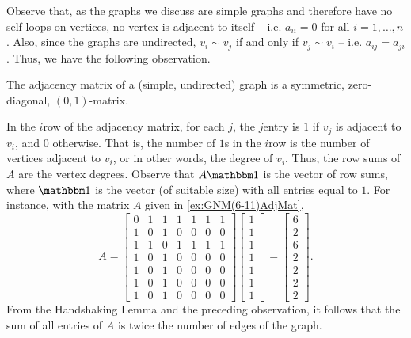 Observe that, as the graphs we discuss are simple graphs and therefore have no self-loops on vertices, no vertex is adjacent to itself -- i.e. $a_{ii} = 0$ for all $i = 1, \ldots, n$. Also, since the graphs are undirected, $v_i \sim v_j$ if and only if $v_j \sim v_i$ -- i.e. $a_{ij} = a_{ji}$. Thus, we have the following observation.

\begin{Observation}
The adjacency matrix of a (simple, undirected) graph is a symmetric, zero-diagonal, $(0, 1)$-matrix.
\end{Observation}

In the $i$\nth row of the adjacency matrix, for each $j$, the $j$\nth entry is $1$ if $v_j$ is adjacent to $v_i$, and $0$ otherwise. That is, the number of $1$s in the $i$\nth row is the number of vertices adjacent to $v_i$, or in other words, the degree of $v_i$. Thus, the row sums of $A$ are the vertex degrees. Observe that $A \mathbbm 1$ is the vector of row sums, where $\mathbbm 1$ is the vector (of suitable size) with all entries equal to $1$. For instance, with the matrix $A$ given in \cref{ex:GNM(6-11)AdjMat},
\begin{equation*}
A = \begin{bmatrix}
0 & 1 & 1 & 1 & 1 & 1 & 1 \\
1 & 0 & 1 & 0 & 0 & 0 & 0 \\
1 & 1 & 0 & 1 & 1 & 1 & 1 \\
1 & 0 & 1 & 0 & 0 & 0 & 0 \\
1 & 0 & 1 & 0 & 0 & 0 & 0 \\
1 & 0 & 1 & 0 & 0 & 0 & 0 \\
1 & 0 & 1 & 0 & 0 & 0 & 0
\end{bmatrix}
\begin{bmatrix}
1 \\ 1 \\ 1 \\ 1 \\ 1 \\ 1 \\ 1
\end{bmatrix} =
\begin{bmatrix}
6 \\ 2 \\ 6 \\ 2 \\ 2 \\ 2 \\ 2
\end{bmatrix}.
\end{equation*}
From the Handshaking Lemma and the preceding observation, it follows that the sum of all entries of $A$ is twice the number of edges of the graph.


